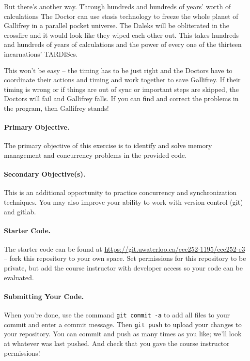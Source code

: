 \documentclass[a4paper]{report}
\newcommand{\termnumeric}{1195}
\begin{document}
But there's another way. Through hundreds and hundreds of years' worth of calculations The Doctor can use stasis technology to freeze the whole planet of Gallifrey in a parallel pocket universe. The Daleks will be obliterated in the crossfire and it would look like they wiped each other out. This takes hundreds and hundreds of years of calculations and the power of every one of the thirteen incarnations' TARDISes.

This won't be easy -- the timing has to be just right and the Doctors have to coordinate their actions and timing and work together to save Gallifrey. If their timing is wrong or if things are out of sync or important steps are skipped, the Doctors will fail and Gallifrey falls. If you can find and correct the problems in the program, then Gallifrey stands!


\paragraph{Primary Objective.} The primary objective of this exercise is to identify and solve memory management and concurrency problems in the provided code.

\paragraph{Secondary Objective(s).} This is an additional opportunity to practice concurrency and synchronization techniques. You may also improve your ability to work with version control (git) and gitlab.

\paragraph{Starter Code.} The starter code can be found at \url{https://git.uwaterloo.ca/ece252-\termnumeric/ece252-e3} -- fork this repository to your own space. Set permissions for this repository to be private, but add the course instructor with developer access so your code can be evaluated.

\paragraph{Submitting Your Code.} When you're done, use the command \texttt{git commit -a} to add all files to your commit and enter a commit message. Then \texttt{git push} to upload your changes to your repository. You can commit and push as many times as you like; we'll look at whatever was last pushed. And check that you gave the course instructor permissions!
\end{document}
